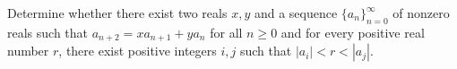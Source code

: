 Determine whether there exist two reals $x,y$ and a sequence $\{a_n\}_{n=0}^{\infty}$ of nonzero reals such that $a_{n+2}=xa_{n+1}+ya_n$ for all $n\ge0$ and for every positive real number $r$, there exist positive integers $i,j$ such that $|a_i|<r<|a_j|$.